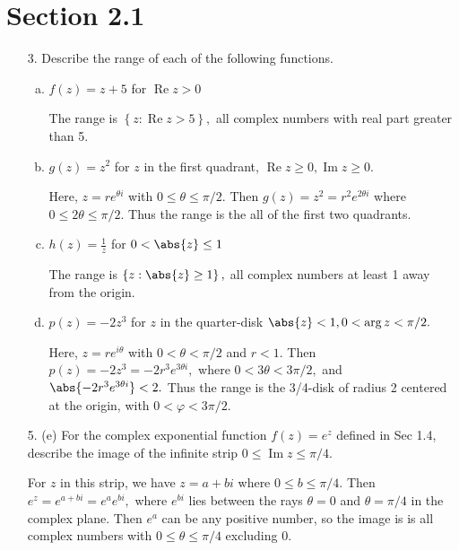 \documentclass{article}
\DeclareMathOperator{\re}{Re}
\DeclareMathOperator{\im}{Im}
\begin{document}
\section*{Section 2.1}

\begin{itemize}
	\item[3.] Describe the range of each of the following functions.
		\begin{enumerate}[(a)]
			\item $f(z)=z+5$ for $\re z>0$
				\begin{soln}
					The range is $\left\{ z:\re z>5 \right\},$ all complex numbers with real part greater than 5.
				\end{soln}

			\item $g(z)=z^2$ for $z$ in the first quadrant, $\re z\ge 0, \im z\ge 0.$
				\begin{soln}
					Here, $z=re^{\theta i}$ with $0\le \theta\le \pi/2.$ Then $g(z)=z^2=r^2e^{2\theta i}$ where $0\le 2\theta \le \pi/2.$ Thus the range is the all of the first two quadrants.
				\end{soln}

			\item $h(z)=\frac{1}{z}$ for $0<\abs{z}\le 1$
				\begin{soln}
					The range is $\left\{ z:\abs{z}\ge 1 \right\},$ all complex numbers at least 1 away from the origin.
				\end{soln}

			\item $p(z)=-2z^3$ for $z$ in the quarter-disk $\abs{z}<1, 0<\arg z<\pi/2.$
				\begin{soln}
					Here, $z=re^{i\theta}$ with $0<\theta<\pi/2$ and $r<1.$ Then $p(z)=-2z^3=-2r^3 e^{3\theta i},$ where $0<3\theta <3\pi/2,$ and $\abs{-2r^3 e^{3\theta i}}<2.$ Thus the range is the 3/4-disk of radius 2 centered at the origin, with $0<\varphi<3\pi/2.$
				\end{soln}
				
		\end{enumerate}

	\item[5.] (e) For the complex exponential function $f(z)=e^z$ defined in Sec 1.4, describe the image of the infinite strip $0\le \im z\le \pi/4.$
		\begin{soln}
			For $z$ in this strip, we have $z=a+bi$ where $0\le b\le \pi/4.$ Then $e^z=e^{a+bi}=e^a e^{bi},$ where $e^{bi}$ lies between the rays $\theta=0$ and $\theta=\pi/4$ in the complex plane. Then $e^a$ can be any positive number, so the image is is all complex numbers with $0\le \theta\le \pi/4$ excluding 0.
		\end{soln}


\end{itemize}
\end{document}
